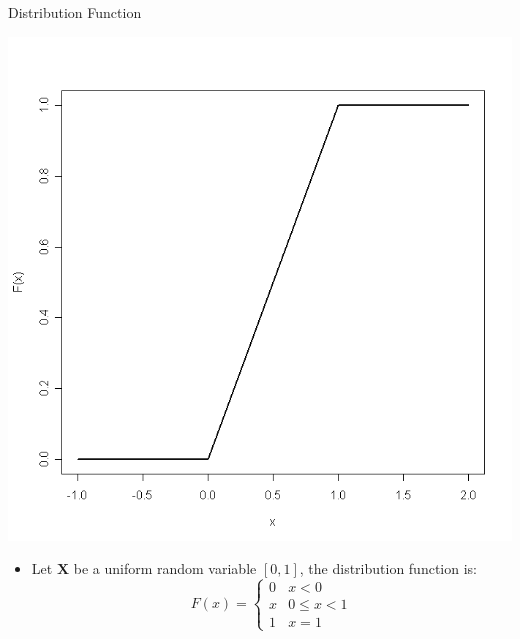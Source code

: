\documentclass[11pt]{beamer}
\theoremstyle{plain}
\theoremstyle{definition}
\theoremstyle{remark}
\begin{document}
\begin{frame}{Distribution Function}

\noindent\begin{minipage}{0.5\textwidth}%
\includegraphics[width=\linewidth]{fig/cumulata_uniforme.png}
\end{minipage}%
\hfill%
\begin{minipage}{0.5\textwidth}
	\begin{itemize}
		\item Let $\mathbf{X}$ be a uniform random variable $[0, 1]$, the distribution function is: 
		\begin{equation*}
		    F(x) = \begin{cases}
		               0               & x < 0\\
		               x               & 0 \le x < 1\\
		               1               & x = 1
		           \end{cases}
		\end{equation*}
	\end{itemize}
\end{minipage}
\end{frame}
%
\end{document}
